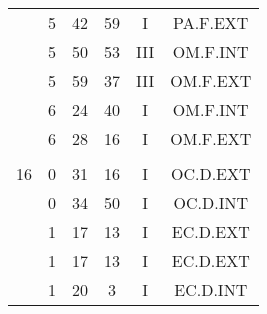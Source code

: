 \documentclass[12pt, a4paper]{article}
\begin{document}
\begin{multicols}{3}
{\begin{tabular}{c c c c c c}
	 	 	 	 & 5 & 42 & 59 & I & PA.F.EXT\\%
	 	 	 	 & 5 & 50 & 53 & III & OM.F.INT\\%
	 	 	 	 & 5 & 59 & 37 & III & OM.F.EXT\\%
	 	 	 	 & 6 & 24 & 40 & I & OM.F.INT\\%
	 	 	 	 & 6 & 28 & 16 & I & OM.F.EXT\\%
	 	 	 	 & & & & & \\%
	 	 	 	16 & 0 & 31 & 16 & I & OC.D.EXT\\%
	 	 	 	 & 0 & 34 & 50 & I & OC.D.INT\\%
	 	 	 	 & 1 & 17 & 13 & I & EC.D.EXT\\%
	 	 	 	 & 1 & 17 & 13 & I & EC.D.EXT\\%
	 	 	 	 & 1 & 20 & 3 & I & EC.D.INT\\%
	 	 \end{tabular}
 	}
\end{multicols}
\end{document}
